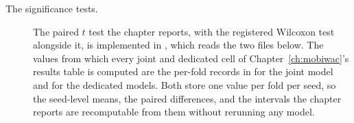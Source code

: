 \begin{description}
  \item[The significance tests.] The paired $t$ test the chapter reports, with the registered
        Wilcoxon test alongside it, is implemented in
        , which reads the two files
        below. The values from which every joint and dedicated cell of
        Chapter~\ref{ch:mobiwac}'s results table is computed are the per-fold records in
         for the joint model
        and  for the dedicated
        models. Both store one value per fold per seed, so the seed-level means, the paired
        differences, and the intervals the chapter reports are recomputable from them
        without rerunning any model.

\end{description}
